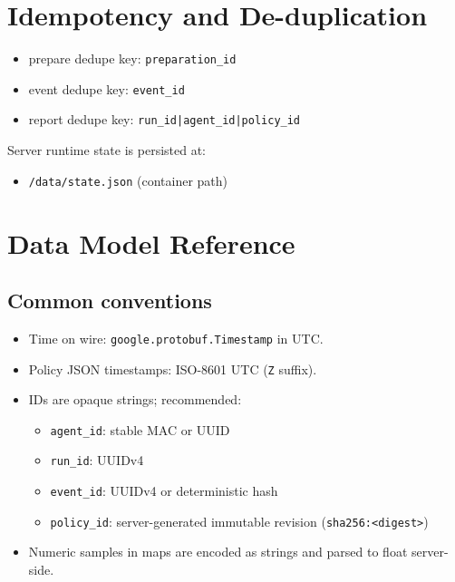\documentclass[11pt,a4paper]{article}
\begin{document}
\section{Idempotency and De-duplication}
\begin{itemize}
  \item prepare dedupe key: \texttt{preparation\_id}
  \item event dedupe key: \texttt{event\_id}
  \item report dedupe key: \texttt{run\_id|agent\_id|policy\_id}
\end{itemize}

Server runtime state is persisted at:
\begin{itemize}
  \item \texttt{/data/state.json} (container path)
\end{itemize}

\section{Data Model Reference}
\subsection{Common conventions}
\begin{itemize}
  \item Time on wire: \texttt{google.protobuf.Timestamp} in UTC.
  \item Policy JSON timestamps: ISO-8601 UTC (\texttt{Z} suffix).
  \item IDs are opaque strings; recommended:
    \begin{itemize}
      \item \texttt{agent\_id}: stable MAC or UUID
      \item \texttt{run\_id}: UUIDv4
      \item \texttt{event\_id}: UUIDv4 or deterministic hash
      \item \texttt{policy\_id}: server-generated immutable revision (\texttt{sha256:<digest>})
    \end{itemize}
  \item Numeric samples in maps are encoded as strings and parsed to float server-side.
\end{itemize}
\end{document}
